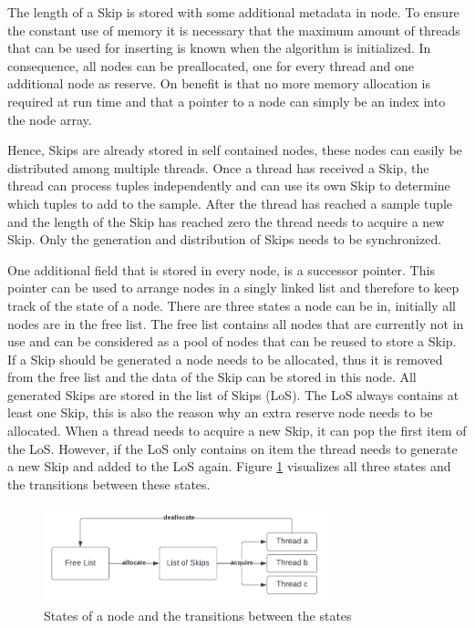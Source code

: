 \documentclass[sigconf,nonacm]{acmart}
\begin{document}
        The length of a Skip is stored with some additional metadata in node. To ensure the constant use of memory it is necessary that the maximum amount of threads that can be used for inserting is known when the algorithm is initialized. In consequence, all nodes can be preallocated, one for every thread and one additional node as reserve. On benefit is that no more memory allocation is required at run time and that a pointer to a node can simply be an index into the node array.

        Hence, Skips are already stored in self contained nodes, these nodes can easily be distributed among multiple threads. Once a thread has received a Skip, the thread can process tuples independently and can use its own Skip to determine which tuples to add to the sample. After the thread has reached a sample tuple and the length of the Skip has reached zero the thread needs to acquire a new Skip. Only the generation and distribution of Skips needs to be synchronized.

        One additional field that is stored in every node, is a successor pointer. This pointer can be used to arrange nodes in a singly linked list and therefore to keep track of the state of a node. There are three states a node can be in, initially all nodes are in the free list. The free list contains all nodes that are currently not in use and can be considered as a pool of nodes that can be reused to store a Skip. If a Skip should be generated a node needs to be allocated, thus it is removed from the free list and the data of the Skip can be stored in this node. All generated Skips are stored in the list of Skips (LoS). The LoS always contains at least one Skip, this is also the reason why an extra reserve node needs to be allocated. When a thread needs to acquire a new Skip, it can pop the first item of the LoS. However, if the LoS only contains on item the thread needs to generate a new Skip and added to the LoS again. Figure \ref{fig:lifecycle} visualizes all three states and the transitions between these states.
        \begin{figure}[h]
            \includegraphics[height=2.8cm]{figure2.pdf}
            \caption{States of a node and the transitions between the states}
            \label{fig:lifecycle}
        \end{figure}
\end{document}
